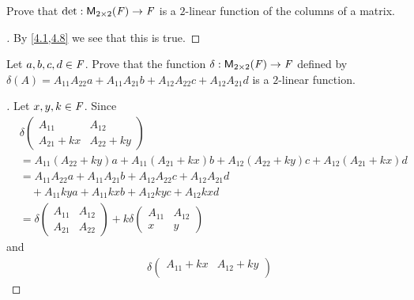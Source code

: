 \setcounter{ex}{12}
\begin{ex}\label{ex:4.5.13}
	Prove that \(\det : \mathsf{M}_{{2} \times 2}({\mathit{F}}) \to \mathit{F}\) is a \(2\)-linear function of the columns of a matrix.
\end{ex}

\begin{proof}[]
	By \cref{4.1,4.8} we see that this is true.
\end{proof}

\begin{ex}\label{ex:4.5.14}
	Let \(a, b, c, d \in \mathit{F}\).
	Prove that the function \(\delta : \mathsf{M}_{{2} \times 2}({\mathit{F}}) \to \mathit{F}\) defined by \(\delta(A) = A_{1 1} A_{2 2} a + A_{1 1} A_{2 1} b + A_{1 2} A_{2 2} c + A_{1 2} A_{2 1} d\) is a \(2\)-linear function.
\end{ex}

\begin{proof}[]
	Let \(x, y, k \in \mathit{F}\).
	Since
	\begin{align*}
		 & \delta\begin{pmatrix}
			         A_{1 1}      & A_{1 2}      \\
			         A_{2 1} + kx & A_{2 2} + ky
		         \end{pmatrix}                                                                           \\
		 & = A_{1 1} (A_{2 2} + ky) a + A_{1 1} (A_{2 1} + kx) b + A_{1 2} (A_{2 2} + ky) c + A_{1 2} (A_{2 1} + kx) d \\
		 & = A_{1 1} A_{2 2} a + A_{1 1} A_{2 1} b + A_{1 2} A_{2 2} c + A_{1 2} A_{2 1} d                             \\
		 & \quad + A_{1 1} ky a + A_{1 1} kx b + A_{1 2} ky c + A_{1 2} kx d                                           \\
		 & = \delta\begin{pmatrix}
			           A_{1 1} & A_{1 2} \\
			           A_{2 1} & A_{2 2}
		           \end{pmatrix} + k \delta\begin{pmatrix}
			                                   A_{1 1} & A_{1 2} \\
			                                   x       & y
		                                   \end{pmatrix}
	\end{align*}
	and
	\begin{align*}
		 & \delta\begin{pmatrix}
			         A_{1 1} + kx & A_{1 2} + ky \\

\end{pmatrix}
\end{align*}
\end{proof}
